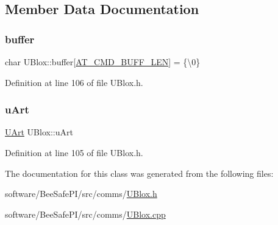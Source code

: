 \subsection{Member Data Documentation}
\mbox{\label{class_u_blox_a6ca4b90f3dc4e856181dce1ebda6f82c}} 
\subsubsection{\texorpdfstring{buffer}{buffer}}
{\footnotesize\ttfamily char U\+Blox\+::buffer\mbox{[}\hyperlink{_u_blox_8h_aad458adf8f40cbcc1074061f226a112e}{A\+T\+\_\+\+C\+M\+D\+\_\+\+B\+U\+F\+F\+\_\+\+L\+EN}\mbox{]} = \{\textquotesingle{}\textbackslash{}0\textquotesingle{}\}\hspace{0.3cm}{\ttfamily [private]}}



Definition at line 106 of file U\+Blox.\+h.

\mbox{\label{class_u_blox_a034c0463d1c199d094d657c8ebb151e8}} 
\subsubsection{\texorpdfstring{u\+Art}{uArt}}
{\footnotesize\ttfamily \hyperlink{class_u_art}{U\+Art} U\+Blox\+::u\+Art\hspace{0.3cm}{\ttfamily [private]}}



Definition at line 105 of file U\+Blox.\+h.



The documentation for this class was generated from the following files\+:\begin{DoxyCompactItemize}
\item 
software/\+Bee\+Safe\+P\+I/src/comms/\hyperlink{_u_blox_8h}{U\+Blox.\+h}\item 
software/\+Bee\+Safe\+P\+I/src/comms/\hyperlink{_u_blox_8cpp}{U\+Blox.\+cpp}\end{DoxyCompactItemize}
